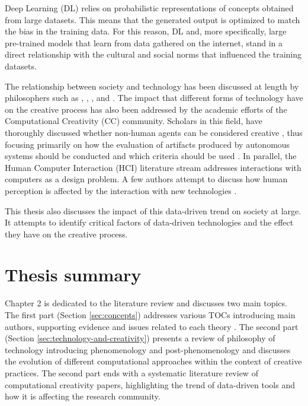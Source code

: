 Deep Learning (DL) relies on probabilistic representations of concepts obtained from large datasets. This means that the generated output is optimized to match the bias in the training data. For this reason, DL and, more specifically, large pre-trained models that learn from data gathered on the internet, stand in a direct relationship with the cultural and social norms that influenced the training datasets.

The relationship between society and technology has been discussed at length by philosophers such as \cite{Heidegger1977}, \cite{Ihde1990}, \cite{Latour1990}, \cite{Flusser2000} and \cite{Verbeek2011}. The impact that different forms of technology have on the creative process has also been addressed by the academic efforts of the Computational Creativity (CC) community. Scholars in this field, have thoroughly discussed whether non-human agents can be considered creative \citep{Wiggins2006a,Wiggins2006}, thus focusing primarily on how the evaluation of artifacts produced by autonomous systems should be conducted and which criteria should be used \citep{Jordanous2009,Boden2010,Lamb2018,Agrawal2019,Colton2008,Colton2012a}. In parallel, the Human Computer Interaction (HCI) literature stream addresses interactions with computers as a design problem. A few authors attempt to discuss how human perception is affected by the interaction with new technologies \citep{Algarni2020,Ragot2020,Hoorn2023}.

This thesis also discusses the impact of this data-driven trend on society at large. It attempts to identify critical factors of  data-driven technologies and the effect they have on the creative process.


\section{Thesis summary}
 
Chapter 2 is dedicated to the literature review and discusses two main topics. The first part (Section \ref{sec:concepts}) addresses various TOCs introducing main authors, supporting evidence and issues related to each theory \citep{Laurence1999}. The second part (Section \ref{sec:technology-and-creativity}) presents a review of philosophy of technology introducing phenomenology and post-phenomenology \citep{Ihde1993,Latour1993,Verbeek2011,Latour1990,Heidegger1977} and discusses the evolution of different computational approaches within the context of creative practices. The second part ends with a systematic literature review of computational creativity papers, highlighting the trend of data-driven tools and how it is affecting the research community.

